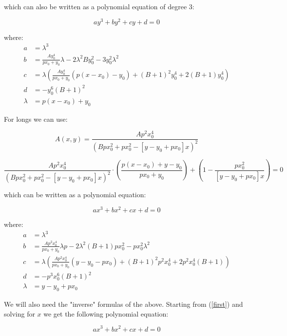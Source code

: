 \documentclass{article}
\begin{document}
which can also be written as a polynomial equation of degree 3:

\begin{equation}
ay^3+by^2+cy+d=0
\end{equation}

where:
\begin{align*}
a &= \lambda ^3\\
b &= \frac{Ay_0^4}{px_0+y_0}\lambda -2\lambda^2By_0^2-3y_0^2\lambda^2\\
c &= \lambda \left(\frac{Ay_0^4}{px_0+y_0}(p(x-x_0)-y_0)+(B+1)^2y_0^4+2(B+1)y_0^4 \right)\\
d &= -y_0^6(B+1)^2\\
\lambda &= p(x-x_0)+y_0
\end{align*}

For longs we can use:

\begin{equation}
A(x,y)=\frac{Ap^2x_0^4}{\left( Bpx_0^2+px_0^2-[y-y_0+px_0]x \right)^2}
\end{equation}

\begin{equation}\label{second}
\frac{Ap^2x_0^4}{\left( Bpx_0^2+px_0^2-[y-y_0+px_0]x \right)^2}\cdot \left( \frac{p(x-x_0)+y-y_0}{px_0+y_0} \right) + \left( 1 - \frac{px_0^2}{[y-y_0+px_0]x} \right) = 0
\end{equation}

which can be written as a polynomial equation:

\begin{equation}
ax^3+bx^2+cx+d=0
\end{equation}

where:
\begin{align*}
a &= \lambda ^3\\
b &= \frac{Ap^2x_0^4}{px_0+y_0}\lambda p -2\lambda^2(B+1)px_0^2-px_0^2\lambda^2\\
c &=  \lambda\left( \frac{Ap^2x_0^4}{px_0+y_0}(y-y_0-px_0)+(B+1)^2p^2x_0^4+2p^2x_0^4(B+1) \right)\\
d &= -p^3x_0^6(B+1)^2\\
\lambda &= y - y_0 +px_0
\end{align*}

We will also need the "inverse" formulas of the above.
Starting from (\ref{first}) and solving for $x$ we get the following polynomial equation:

\begin{equation}\label{third}
ax^3+bx^2+cx+d=0
\end{equation}
\end{document}
